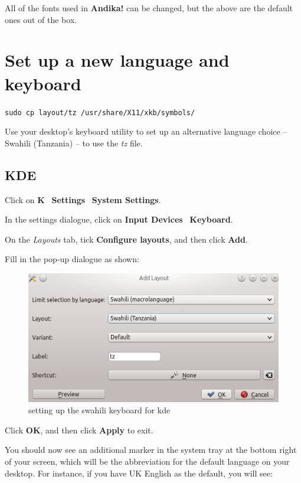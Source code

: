 \documentclass[a4paper,10pt, oneside]{book}
\begin{document}
All of the fonts used in \textbf{Andika!} can be changed, but the above are the default ones out of the box.


\section{Set up a new language and keyboard}
\label{s:keyboard}

\verb|sudo cp layout/tz /usr/share/X11/xkb/symbols/|

Use your desktop's keyboard utility to set up an alternative language choice -- Swahili (Tanzania) -- to use the \textit{tz} file.

\subsection{KDE}

Click on \textbf{K} \textrightarrow\ \textbf{Settings} \textrightarrow\ \textbf{System Settings}.

In the settings dialogue, click on \textbf{Input Devices} \textrightarrow\ \textbf{Keyboard}.

On the \textit{Layouts} tab, tick \textbf{Configure layouts}, and then click \textbf{Add}.

Fill in the pop-up dialogue as shown:

\begin{figure}[h]
\centering
\includegraphics[keepaspectratio=true]{./images/kdelg.png}
\caption{setting up the swahili keyboard for kde}
\end{figure}

Click \textbf{OK}, and then click \textbf{Apply} to exit.

You should now see an additional marker in the system tray at the bottom right of your screen, which will be the abbreviation for the default language on your desktop.  For instance, if you have UK English as the default, you will see:
\end{document}
